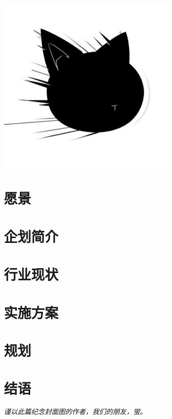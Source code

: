 \documentclass[11pt,UTF8,a4paper]{ctexart}
\begin{document}

    \tableofcontents
    \vspace*{\fill}
    \begin{center}
        \includegraphics[width=0.67\textwidth]{assets/img197}
    \end{center}
    \clearpage



    \section{愿景}\label{sec:goal}
    


    \section{企划简介}\label{sec:intro}
    


    \section{行业现状}\label{sec:now}
    


    \section{实施方案}\label{sec:solution}
    


    \section{规划}\label{sec:roadmap}
    


    \section{结语}\label{sec:end}
    

    \clearpage

    \thispagestyle{empty}
    \vspace*{\fill}
    \begin{center}
        \textit{谨以此篇纪念封面图的作者，我们的朋友，蛍。}
    \end{center}
    \vspace*{\fill}
    \clearpage

    
    
\end{document}
